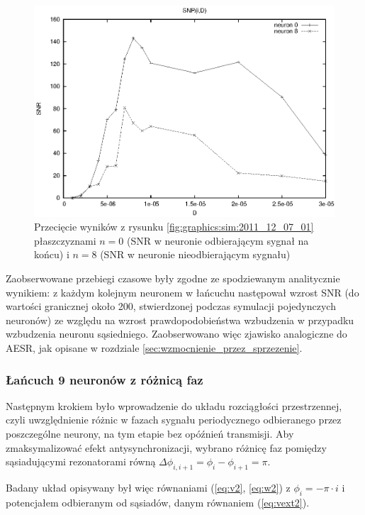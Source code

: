   \begin{figure}
    \includegraphics[width=140mm]{images/9neuron/2011_12_07_02}
    \caption{Przecięcie wyników z rysunku \ref{fig:graphics:sim:2011_12_07_01} płaszczyznami $n=0$ (SNR w neuronie odbierającym sygnał na końcu) i $n=8$ (SNR w neuronie nieodbierającym sygnału)}
    \label{fig:graphics:sim:2011_12_07_02}
  \end{figure}

  Zaobserwowane przebiegi czasowe były zgodne ze spodziewanym analitycznie wynikiem: z każdym kolejnym neuronem w łańcuchu następował wzrost SNR (do wartości granicznej około 200, stwierdzonej podczas symulacji pojedynczych neuronów) ze względu na wzrost prawdopodobieństwa wzbudzenia w przypadku wzbudzenia neuronu sąsiedniego. Zaobserwowano więc zjawisko analogiczne do AESR, jak opisane w rozdziale \ref{sec:wzmocnienie_przez_sprzezenie}.

  \subsubsection{Łańcuch 9 neuronów z różnicą faz}

  Następnym krokiem było wprowadzenie do układu rozciągłości przestrzennej, czyli uwzględnienie różnic w fazach sygnału periodycznego odbieranego przez poszczególne neurony, na tym etapie bez opóźnień transmisji. Aby zmaksymalizować efekt antysynchronizacji, wybrano różnicę faz pomiędzy sąsiadującymi rezonatorami równą $\Delta \phi_{i,i+1} = \phi_{i} - \phi_{i+1} = \pi $.

  Badany układ opisywany był więc równaniami (\ref{eq:v2}, \ref{eq:w2}) z $\phi_i = -\pi \cdot i$ i potencjałem odbieranym od sąsiadów, danym równaniem (\ref{eq:vext2}).

